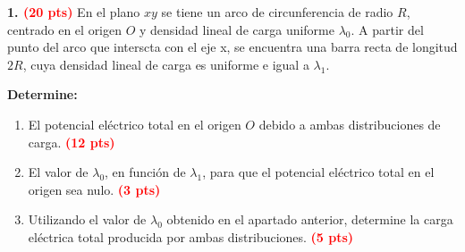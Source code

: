 \documentclass[12pt]{article}
\begin{document}
\noindent
\textbf{1. \textcolor{red}{(20 pts)}} 
En el plano $xy$ se tiene un arco de circunferencia de radio $R$, 
centrado en el origen $O$ y densidad lineal de carga uniforme $\lambda_0$. A partir del punto del arco que interscta con el eje x, se encuentra una barra recta de longitud $2R$, cuya densidad lineal de carga es uniforme e igual a $\lambda_1$.

\vspace{0.25cm}

\noindent
\begin{minipage}[t]{0.58\textwidth}
\vspace{0pt}

\textbf{Determine:}

\vspace{0.25cm}

\begin{enumerate}[
    label=\alph*),
    leftmargin=0.55cm,
    labelsep=0.15cm,
    itemsep=0.55cm,
    topsep=0pt
]

    \item El potencial eléctrico total en el origen $O$ debido a 
    ambas distribuciones de carga. \textcolor{red}{\textbf{(12 pts)}}

    \item El valor de $\lambda_0$, en función de $\lambda_1$, para 
    que el potencial eléctrico total en el origen sea nulo. \textcolor{red}{\textbf{(3 pts)}}

    \item Utilizando el valor de $\lambda_0$ obtenido en el apartado 
    anterior, determine la carga eléctrica total producida por ambas distribuciones. \textcolor{red}{\textbf{(5 pts)}}

\end{enumerate}

\end{minipage}
\hfill
%
\end{document}
